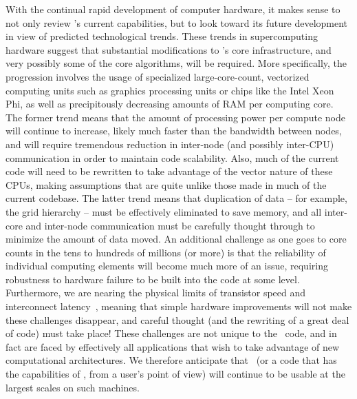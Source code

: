 With the continual rapid development of computer hardware, it makes
sense to not only review \enzo's current capabilities, but to look
toward its future development in view of predicted technological
trends. These trends in supercomputing hardware suggest that
substantial modifications to \enzo's core infrastructure, and very
possibly some of the core algorithms, will be required. More
specifically, the progression involves the usage of specialized
large-core-count, vectorized computing units such as graphics
processing units or chips like the Intel Xeon Phi, as well as
precipitously decreasing amounts of RAM per computing core.  The
former trend means that the amount of processing power per compute
node will continue to increase, likely much faster than the bandwidth
between nodes, and will require tremendous reduction in inter-node
(and possibly inter-CPU) communication in order to maintain code
scalability.  Also, much of the current code will need to be rewritten
to take advantage of the vector nature of these CPUs, making
assumptions that are quite unlike those made in much of the current
codebase.  The latter trend means that duplication of data -- for
example, the grid hierarchy -- must be effectively eliminated to save
memory, and all inter-core and inter-node communication must be
carefully thought through to minimize the amount of data moved.  An
additional challenge as one goes to core counts in the tens to
hundreds of millions (or more) is that the reliability of individual
computing elements will become much more of an issue, requiring
robustness to hardware failure to be built into the code at some
level.  Furthermore, we are nearing the physical limits of transistor
speed and interconnect latency~\citep{feynman1999feynman}, meaning that simple
hardware improvements will not make these challenges disappear, and
careful thought (and the rewriting of a great deal of code) must take
place!  These challenges are not unique to the \enzo\ code, and in
fact are faced by effectively all applications that wish to take
advantage of new computational architectures. We therefore anticipate
that \enzo\ (or a code that has the capabilities of \enzo, from a
user's point of view) will continue to be usable at the
largest scales on such machines.

